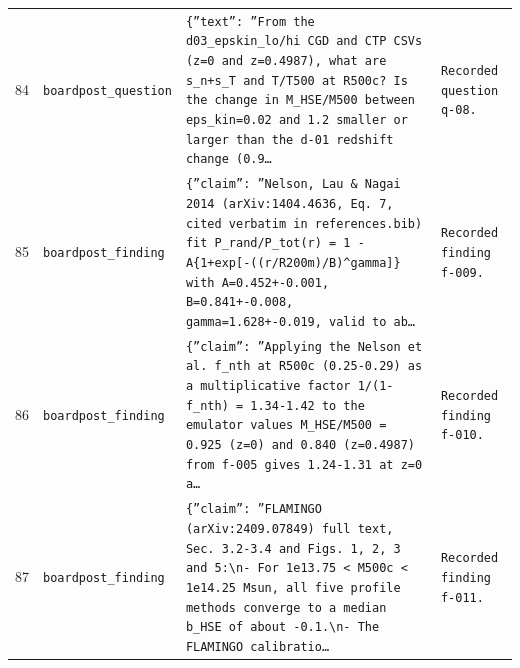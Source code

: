 \documentclass[11pt,a4paper]{article}
\begin{document}
\begin{longtable}{@{}p{}p{}p{}p{}@{}}
84 & \texttt{board}\newline\texttt{post\_\allowbreak{}question} & \texttt{\{''text'':\allowbreak{} ''From the d03\_\allowbreak{}epskin\_\allowbreak{}lo/\allowbreak{}hi CGD and CTP CSVs (z=\allowbreak{}0 and z=\allowbreak{}0.4987)\allowbreak{},\allowbreak{} what are s\_\allowbreak{}n+s\_\allowbreak{}T and T/\allowbreak{}T500 at R500c? Is the change in M\_\allowbreak{}HSE/\allowbreak{}M500 between eps\_\allowbreak{}kin=\allowbreak{}0.02 and 1.2 smaller or larger than the d-01 redshift change (0.9\ldots{}\allowbreak{}} & \texttt{Recorded question q-08.} \\
85 & \texttt{board}\newline\texttt{post\_\allowbreak{}finding} & \texttt{\{''claim'':\allowbreak{} ''Nelson,\allowbreak{} Lau \& Nagai 2014 (arXiv:\allowbreak{}1404.4636,\allowbreak{} Eq. 7,\allowbreak{} cited verbatim in references.bib)\allowbreak{} fit P\_\allowbreak{}rand/\allowbreak{}P\_\allowbreak{}tot(r)\allowbreak{} =\allowbreak{} 1 - A\{1+exp[-((r/\allowbreak{}R200m)\allowbreak{}/\allowbreak{}B)\allowbreak{}\textasciicircum{}\allowbreak{}gamma]\allowbreak{}\}\allowbreak{} with A=\allowbreak{}0.452+-0.001,\allowbreak{} B=\allowbreak{}0.841+-0.008,\allowbreak{} gamma=\allowbreak{}1.628+-0.019,\allowbreak{} valid to ab\ldots{}\allowbreak{}} & \texttt{Recorded finding f-009.} \\
86 & \texttt{board}\newline\texttt{post\_\allowbreak{}finding} & \texttt{\{''claim'':\allowbreak{} ''Applying the Nelson et al. f\_\allowbreak{}nth at R500c (0.25-0.29)\allowbreak{} as a multiplicative factor 1/\allowbreak{}(1-f\_\allowbreak{}nth)\allowbreak{} =\allowbreak{} 1.34-1.42 to the emulator values M\_\allowbreak{}HSE/\allowbreak{}M500 =\allowbreak{} 0.925 (z=\allowbreak{}0)\allowbreak{} and 0.840 (z=\allowbreak{}0.4987)\allowbreak{} from f-005 gives 1.24-1.31 at z=\allowbreak{}0 a\ldots{}\allowbreak{}} & \texttt{Recorded finding f-010.} \\
87 & \texttt{board}\newline\texttt{post\_\allowbreak{}finding} & \texttt{\{''claim'':\allowbreak{} ''FLAMINGO (arXiv:\allowbreak{}2409.07849)\allowbreak{} full text,\allowbreak{} Sec. 3.2-3.4 and Figs. 1,\allowbreak{} 2,\allowbreak{} 3 and 5:\allowbreak{}\textbackslash{}\allowbreak{}n- For 1e13.75 \textless{}\allowbreak{} M500c \textless{}\allowbreak{} 1e14.25 Msun,\allowbreak{} all five profile methods converge to a median b\_\allowbreak{}HSE of about -0.1.\textbackslash{}\allowbreak{}n- The FLAMINGO calibratio\ldots{}\allowbreak{}} & \texttt{Recorded finding f-011.} \\

\end{longtable}
\end{document}
